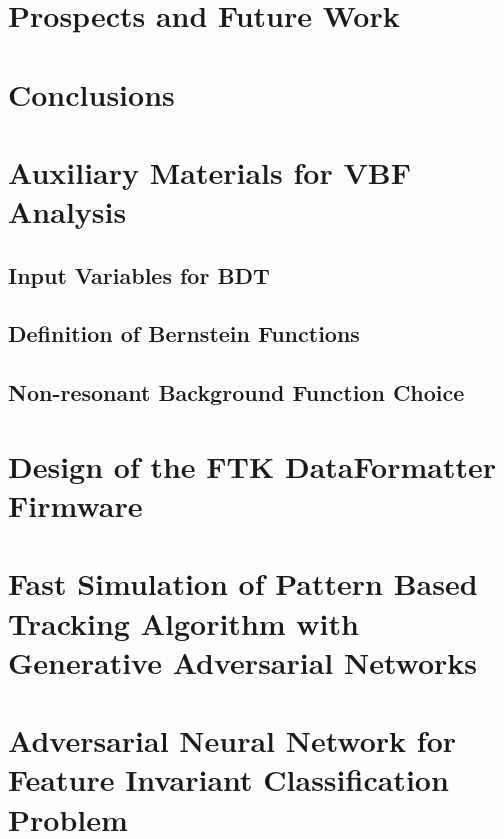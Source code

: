 \documentclass{report}
\begin{document}
\chapter{Prospects and Future Work}
\chapter{Conclusions}

\appendix
\chapter{Auxiliary Materials for VBF \Hbb Analysis}
\section{Input Variables for BDT}

\section{Definition of Bernstein Functions}

\section{Non-resonant Background Function Choice}


\chapter{Design of the FTK DataFormatter Firmware}
\chapter{Fast Simulation of Pattern Based Tracking Algorithm with Generative Adversarial Networks}
\chapter{Adversarial Neural Network for Feature Invariant Classification Problem}



\end{document}
